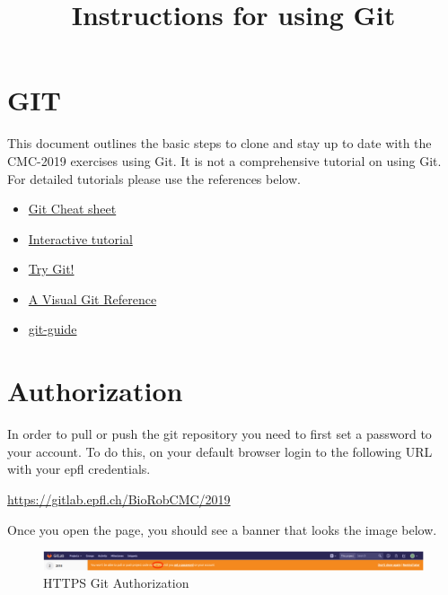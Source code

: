 \documentclass{cmc}
\title{Instructions for using Git}
\begin{document}
\maketitle
\tableofcontents
\pagestyle{fancy}
 

\newpage

\section{GIT}
\label{sec:git}

This document outlines the basic steps to clone and stay up to date
with the CMC-2019 exercises using Git. It is not a comprehensive
tutorial on using Git. For detailed tutorials please use the
references below.

\begin{itemize}
\item \href{http://ndpsoftware.com/git-cheatsheet.html}{Git
    Cheat sheet}
\item \href{https://learngitbranching.js.org}{Interactive tutorial}
\item \href{https://try.github.io/levels/1/challenges/1}{Try Git!}
\item
  \href{https://marklodato.github.io/visual-git-guide/index-en.html}{A
    Visual Git Reference}
\item \href{http://rogerdudler.github.io/git-guide/}{git-guide}
\end{itemize}


\section{Authorization}
In order to pull or push the git repository you need to first set a
password to your account.  To do this, on your default browser login
to the following URL with your epfl credentials.

\url{https://gitlab.epfl.ch/BioRobCMC/2019}

Once you open the page, you should see a banner that looks the image
below.

\begin{figure}[h]
  \centering \includegraphics[width =
  \textwidth]{figures/GitAuthorization}
  \caption{HTTPS Git Authorization}
  \label{fig:authorization}
\end{figure}
\end{document}
